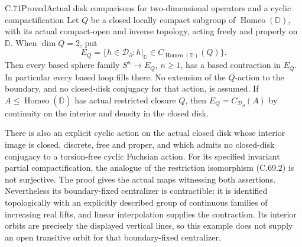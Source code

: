 \begin{claim}{C.71}{Proved}{Actual disk comparisons for two-dimensional operators and a cyclic compactification}
Let $Q$ be a closed locally compact subgroup of
$\operatorname{Homeo}(\mathbb D)$, with its actual compact-open
and inverse topology, acting freely and properly on $\mathbb D$.
When $\dim Q=2$, put
\[
 E_Q=\{h\in\mathcal D_\partial:
                    h|_{\mathbb D}\in
                    C_{\operatorname{Homeo}(\mathbb D)}(Q)\}.
                                                               \tag{C.71.1}
\]
Then every based sphere family $S^n\to E_Q$, $n\geq1$, has a
based contraction in $E_Q$. In particular every based loop
fills there. No extension of the $Q$-action to the boundary,
and no closed-disk conjugacy for that action, is assumed.
If $A\leq\operatorname{Homeo}(\overline{\mathbb D})$ has
actual restricted closure $Q$, then
$E_Q=C_{\mathcal D_\partial}(A)$ by continuity on the
interior and density in the closed disk.

There is also an explicit cyclic action on the actual closed
disk whose interior image is closed, discrete, free and proper,
and which admits no closed-disk
conjugacy to a torsion-free cyclic Fuchsian action. For its
specified invariant partial compactification, the analogue of
the restriction isomorphism (C.69.2) is not surjective. The
proof gives the actual maps witnessing both assertions.
Nevertheless its boundary-fixed centralizer is contractible:
it is identified topologically with an explicitly described
group of continuous families of increasing real lifts, and
linear interpolation supplies the contraction. Its interior
orbits are precisely the displayed vertical lines, so this
example does not supply an open transitive orbit for that
boundary-fixed centralizer.
\end{claim}

